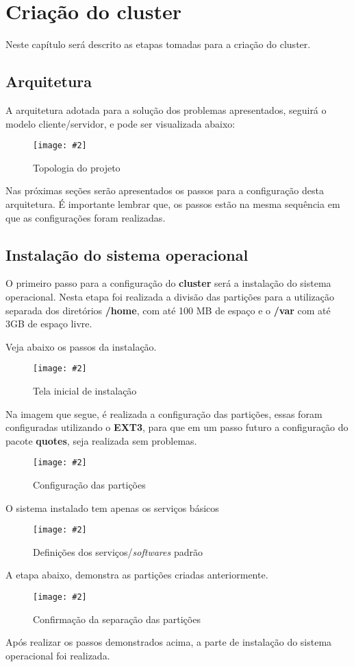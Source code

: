 \documentclass[
	12pt,				%
	openany,			%
	a4paper,			%
	chapter=TITLE,		%
	section=TITLE,		%
	english,
	brazil				%
]{abntex2}
\newcommand{\includeImage}[3] {

\begin{figure}[H]
 	 \centering
  		\texttt{[image: \#2]}
  	\caption{#3}
\end{figure}

}
\begin{document}
\chapter{Criação do cluster}

Neste capítulo será descrito as etapas tomadas para a criação do cluster. 

\section{Arquitetura}

A arquitetura adotada para a solução dos problemas apresentados, seguirá o modelo cliente/servidor, e pode ser visualizada abaixo:

\includeImage{0.7}{imgs/others/topologia.png}{Topologia do projeto}

Nas próximas seções serão apresentados os passos para a configuração desta arquitetura. É importante lembrar que, os passos estão na mesma sequência em que as configurações foram realizadas.

\section{Instalação do sistema operacional}

O primeiro passo para a configuração do \textbf{cluster} será a instalação do sistema operacional. Nesta etapa foi realizada a divisão das partições para a utilização separada dos diretórios \textbf{/home}, com até 100 MB de espaço e o \textbf{/var} com até 3GB de espaço livre.

Veja abaixo os passos da instalação.

\includeImage{0.5}{imgs/1_instalacao/1.png}{Tela inicial de instalação}

Na imagem que segue, é realizada a configuração das partições, essas foram configuradas utilizando o \textbf{EXT3}, para que em um passo futuro a configuração do pacote \textbf{quotes}, seja realizada sem problemas.
\includeImage{0.5}{imgs/1_instalacao/2.png}{Configuração das partições}

O sistema instalado tem apenas os serviços básicos
\includeImage{0.5}{imgs/1_instalacao/3.png}{Definições dos serviços/\textit{softwares} padrão}

A etapa abaixo, demonstra as partições criadas anteriormente.
\includeImage{0.5}{imgs/1_instalacao/4.png}{Confirmação da separação das partições}


Após realizar os passos demonstrados acima, a parte de instalação do sistema operacional foi realizada.
\end{document}

